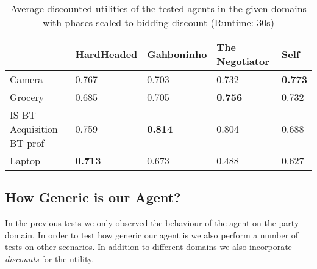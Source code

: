 \begin{table}[H]
  \centering
  \small
  \begin{tabular}{l|p{2.5cm}|p{2.5cm}|p{2.5cm}|p{2.5cm}|}
                            & HardHeaded     & Gahboninho & The Negotiator & Self \\ \hline
  Camera                    & 0.767          & 0.703          & 0.732          & \textbf{0.773} \\ \hline
  Grocery                   & 0.685          & 0.705          & \textbf{0.756} & 0.732          \\ \hline
  IS BT Acquisition BT prof & 0.759          & \textbf{0.814} & 0.804          & 0.688          \\ \hline
  Laptop                    & \textbf{0.713} & 0.673          & 0.488          & 0.627          \\ \hline
  \end{tabular}
  \caption{Average discounted utilities of the tested agents in the given domains with phases scaled to bidding discount (Runtime: $30$s) \label{table:anac2011-domains3}}
\end{table}


\subsection{How Generic is our Agent?}

In the previous tests we only observed the behaviour of the agent on the party domain. In order to test how generic our agent is we also perform a number of tests on other scenarios. In addition to different domains we also incorporate \emph{discounts} for the utility. \\


